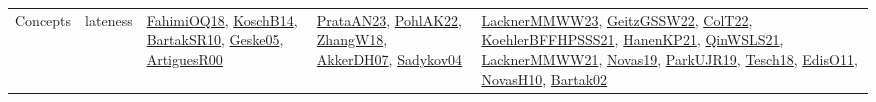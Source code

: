 {\begin{longtable}{lp{3cm}>{\raggedright}p{6cm}>{\raggedright}p{6cm}p{8cm}}
Concepts & lateness & \href{articles/FahimiOQ18.pdf}{FahimiOQ18}\cite{FahimiOQ18}, \href{papers/KoschB14.pdf}{KoschB14}\cite{KoschB14}, \href{articles/BartakSR10.pdf}{BartakSR10}\cite{BartakSR10}, \href{papers/Geske05.pdf}{Geske05}\cite{Geske05}, \href{articles/ArtiguesR00.pdf}{ArtiguesR00}\cite{ArtiguesR00} & \href{articles/PrataAN23.pdf}{PrataAN23}\cite{PrataAN23}, \href{articles/PohlAK22.pdf}{PohlAK22}\cite{PohlAK22}, \href{articles/ZhangW18.pdf}{ZhangW18}\cite{ZhangW18}, \href{papers/AkkerDH07.pdf}{AkkerDH07}\cite{AkkerDH07}, \href{papers/Sadykov04.pdf}{Sadykov04}\cite{Sadykov04} & \href{articles/LacknerMMWW23.pdf}{LacknerMMWW23}\cite{LacknerMMWW23}, \href{papers/GeitzGSSW22.pdf}{GeitzGSSW22}\cite{GeitzGSSW22}, \href{articles/ColT22.pdf}{ColT22}\cite{ColT22}, \href{articles/KoehlerBFFHPSSS21.pdf}{KoehlerBFFHPSSS21}\cite{KoehlerBFFHPSSS21}, \href{papers/HanenKP21.pdf}{HanenKP21}\cite{HanenKP21}, \href{articles/QinWSLS21.pdf}{QinWSLS21}\cite{QinWSLS21}, \href{papers/LacknerMMWW21.pdf}{LacknerMMWW21}\cite{LacknerMMWW21}, \href{articles/Novas19.pdf}{Novas19}\cite{Novas19}, \href{papers/ParkUJR19.pdf}{ParkUJR19}\cite{ParkUJR19}, \href{papers/Tesch18.pdf}{Tesch18}\cite{Tesch18}, \href{papers/EdisO11.pdf}{EdisO11}\cite{EdisO11}, \href{articles/NovasH10.pdf}{NovasH10}\cite{NovasH10}, \href{papers/Bartak02.pdf}{Bartak02}\cite{Bartak02}\\

\end{longtable}}
